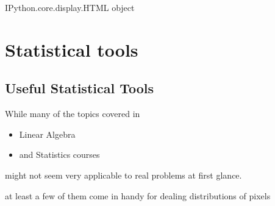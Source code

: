 \documentclass[letterpaper,10pt,english]{sphinxmanual}
\begin{document}
\begin{sphinxVerbatim}[commandchars=\\\{\}]
  
\end{sphinxVerbatim}

\begin{sphinxVerbatim}[commandchars=\\\{\}]
\PYGZlt{}IPython.core.display.HTML object\PYGZgt{}
\end{sphinxVerbatim}


\chapter{Statistical tools}
\label{\detokenize{06-ShapeAnalysis:statistical-tools}}

\section{Useful Statistical Tools}
\label{\detokenize{06-ShapeAnalysis:useful-statistical-tools}}
\sphinxAtStartPar
While many of the topics covered in
\begin{itemize}
\item {} 
\sphinxAtStartPar
Linear Algebra

\item {} 
\sphinxAtStartPar
and Statistics courses

\end{itemize}

\sphinxAtStartPar
might not seem very applicable to real problems at first glance.

\sphinxAtStartPar
at least a few of them come in handy for dealing distributions of pixels

\sphinxAtStartPar
{}
\end{document}
